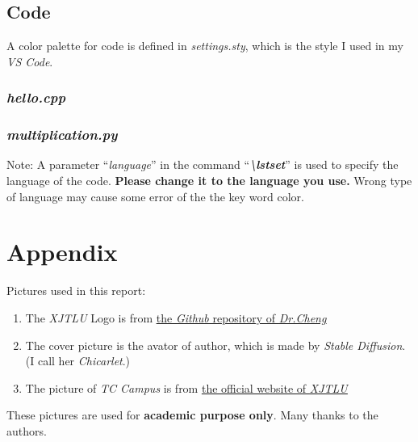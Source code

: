 \documentclass{article}
\begin{document}
\subsection{Code}
\noindent A color palette for code is defined in \textit{settings.sty}, which is the style I used in my \textit{VS Code}.
\subsubsection{\textit{hello.cpp}}


\subsubsection{\textit{multiplication.py}}


\noindent Note: A parameter ``\textit{language}'' in the command ``\textit{\textbf{\textbackslash lstset}}'' is used to specify the language of the code. 
\textbf{Please change it to the language you use.} 
Wrong type of language may cause some error of the the key word color.

\newpage
\section{Appendix}
\noindent Pictures used in this report:
\begin{enumerate}
    \item The \textit{XJTLU} Logo is from \href{https://github.com/feimax/latex_template_for_xjtlu_eee_light}{\underline{the \textit{Github} repository of \textit{Dr.Cheng}}}
    \item The cover picture is the avator of author, which is made by \textit{Stable Diffusion}. (I call her \textit{Chicarlet}.)
    \item The picture of \textit{TC Campus} is from \href{https://www.xjtlu.edu.cn/en/study/departments/entrepreneurship-and-enterprise-hub}{\underline{the official website of \textit{XJTLU}}}
\end{enumerate}

These pictures are used for \textbf{academic purpose only}. Many thanks to the authors.

\newpage


\end{document}

